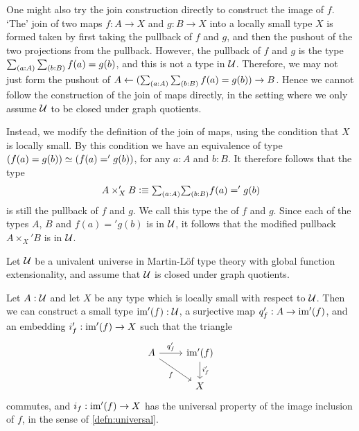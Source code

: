 One might also try the join construction directly to construct the image of
$f$. `The' join of two maps $f:A\to X$ and $g:B\to X$ into a locally small type
$X$ is formed taken by first taking the pullback of $f$ and $g$, and then the 
pushout of the two projections from the pullback.
However, the pullback of $f$ and $g$ is the type $\sm{a:A}{b:B}f(a)=g(b)$, and
this is not a type in $\mathcal{U}$. Therefore, we may not just form the pushout
of $A \leftarrow (\sm{a:A}{b:B}f(a)=g(b)) \rightarrow B$. 
Hence we cannot follow the construction of the join of maps directly, in the
setting where we only assume $\mathcal{U}$ to be closed under graph quotients.

Instead, we modify the definition of the join of maps, using the
condition that $X$ is locally small. By this condition we have
an equivalence of type $\eqv{(f(a)=g(b))}{(f(a)='g(b))}$, for any $a:A$ and 
$b:B$. It therefore follows that the type
\begin{equation}\label{eq:modified_pullback}
A\times'_X B \defeq \sm{a:A}{b:B}f(a)='g(b)
\end{equation} is
still the pullback of $f$ and $g$. We call this type the  of $f$ and $g$.
Since each of the types $A$, $B$ and $f(a)='g(b)$ is in $\mathcal{U}$, it follows that
the modified pullback $A\times_X'B$ is in $\mathcal{U}$.

\begin{thm}\label{thm:modified-join}
Let $\mathcal{U}$ be a univalent universe in Martin-L\"of type theory with global function extensionality, 
and assume that $\mathcal{U}$ is closed under graph quotients. 

Let $A:\mathcal{U}$ and let $X$ be any type which is locally small with respect to $\mathcal{U}$.
Then we can construct a small type $\operatorname{im}'(f):\mathcal{U}$, a surjective map $q'_f:A\to\operatorname{im}'(f)$, and an embedding $i'_f:\operatorname{im}'(f)\to X$ such that the triangle
\begin{equation*}
\begin{tikzcd}
A \arrow[r,"{q'_f}"] \arrow[dr,swap,"f"] & \im'(f) \arrow[d,"{i'_f}"] \\
& X
\end{tikzcd}
\end{equation*}
commutes, and $i_f:\operatorname{im}'(f)\to X$ has the universal property of the image inclusion of $f$, in the sense of \autoref{defn:universal}.
\end{thm}

